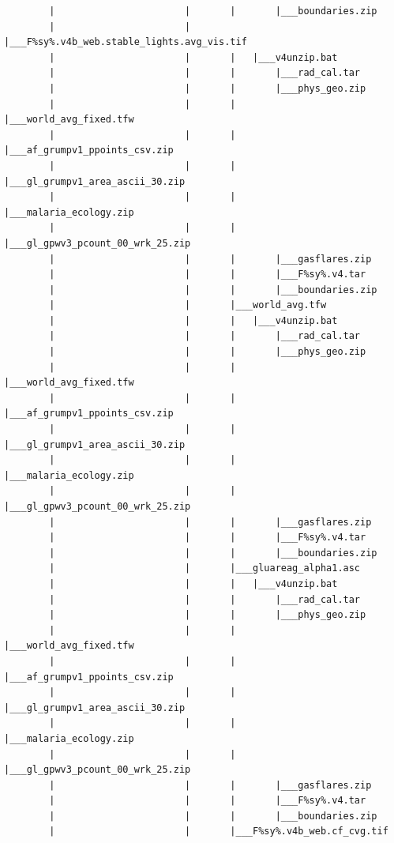 \documentclass[]{book}
\begin{document}
\begin{verbatim}
        |                       |       |       |___boundaries.zip
        |                       |       |___F%sy%.v4b_web.stable_lights.avg_vis.tif
        |                       |       |   |___v4unzip.bat
        |                       |       |       |___rad_cal.tar
        |                       |       |       |___phys_geo.zip
        |                       |       |       |___world_avg_fixed.tfw
        |                       |       |       |___af_grumpv1_ppoints_csv.zip
        |                       |       |       |___gl_grumpv1_area_ascii_30.zip
        |                       |       |       |___malaria_ecology.zip
        |                       |       |       |___gl_gpwv3_pcount_00_wrk_25.zip
        |                       |       |       |___gasflares.zip
        |                       |       |       |___F%sy%.v4.tar
        |                       |       |       |___boundaries.zip
        |                       |       |___world_avg.tfw
        |                       |       |   |___v4unzip.bat
        |                       |       |       |___rad_cal.tar
        |                       |       |       |___phys_geo.zip
        |                       |       |       |___world_avg_fixed.tfw
        |                       |       |       |___af_grumpv1_ppoints_csv.zip
        |                       |       |       |___gl_grumpv1_area_ascii_30.zip
        |                       |       |       |___malaria_ecology.zip
        |                       |       |       |___gl_gpwv3_pcount_00_wrk_25.zip
        |                       |       |       |___gasflares.zip
        |                       |       |       |___F%sy%.v4.tar
        |                       |       |       |___boundaries.zip
        |                       |       |___gluareag_alpha1.asc
        |                       |       |   |___v4unzip.bat
        |                       |       |       |___rad_cal.tar
        |                       |       |       |___phys_geo.zip
        |                       |       |       |___world_avg_fixed.tfw
        |                       |       |       |___af_grumpv1_ppoints_csv.zip
        |                       |       |       |___gl_grumpv1_area_ascii_30.zip
        |                       |       |       |___malaria_ecology.zip
        |                       |       |       |___gl_gpwv3_pcount_00_wrk_25.zip
        |                       |       |       |___gasflares.zip
        |                       |       |       |___F%sy%.v4.tar
        |                       |       |       |___boundaries.zip
        |                       |       |___F%sy%.v4b_web.cf_cvg.tif

\end{verbatim}
\end{document}
